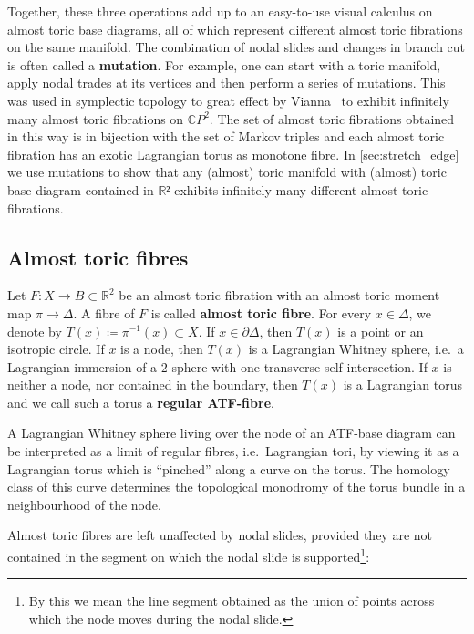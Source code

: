 \documentclass[AIF,Unicode,manuscript]{cedram}
\begin{document}
Together, these three operations add up to an easy-to-use visual calculus on almost toric base diagrams, all of which represent different almost toric fibrations on the same manifold.
The combination of nodal slides and changes in branch cut is often called a \textbf{mutation}.
For example, one can start with a toric manifold, apply nodal trades at its vertices and then perform a series of mutations.
This was used in symplectic topology to great effect by Vianna~\cite{Via16} to exhibit infinitely many almost toric fibrations on $\mathbb{C}P^2$.
The set of almost toric fibrations obtained in this way is in bijection with the set of Markov triples and each almost toric fibration has an exotic Lagrangian torus as monotone fibre.
In \cref{sec:stretch_edge} we use mutations to show that any (almost) toric manifold with (almost) toric base diagram contained in $ℝ²$ exhibits infinitely many different almost toric fibrations.

\subsection{Almost toric fibres}
\label{sec:atfibres}

Let $F \colon X \rightarrow B \subset \mathbb{R}^2$ be an almost toric fibration with an almost toric moment map $\pi \to \Delta$.
A fibre of $F$ is called \textbf{almost toric fibre}.
For every $x \in \Delta$, we denote by $T(x) ≔ π^{-1}(x) \subset X$.
If $x \in \partial \Delta$, then $T(x)$ is a point or an isotropic circle.
If $x$ is a node, then $T(x)$ is a Lagrangian Whitney sphere, i.e.\ a Lagrangian immersion of a $2$-sphere with one transverse self-intersection.
If $x$ is neither a node, nor contained in the boundary, then $T(x)$ is a Lagrangian torus and we call such a torus a \textbf{regular ATF-fibre}.

\begin{remark}
    \label{rk:pinchedtorus}
    A Lagrangian Whitney sphere living over the node of an ATF-base diagram can be interpreted as a limit of regular fibres, i.e.\ Lagrangian tori, by viewing it as a Lagrangian torus which is ``pinched'' along a curve on the torus.
The homology class of this curve determines the topological monodromy of the torus bundle in a neighbourhood of the node.
\end{remark}

Almost toric fibres are left unaffected by nodal slides, provided they are not contained in the segment on which the nodal slide is supported\footnote{By this we mean the line segment obtained as the union of points across which the node moves during the nodal slide.}:
\end{document}
